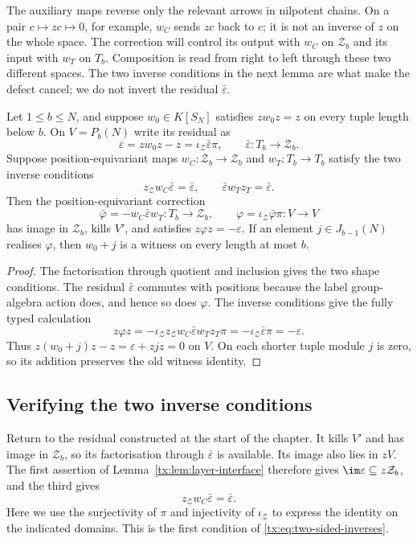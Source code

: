 The auxiliary maps reverse only the relevant arrows in nilpotent
chains. On a pair $c\mapsto zc\mapsto0$, for example, $w_C$ sends
$zc$ back to $c$; it is not an inverse of $z$ on the whole space.
The correction will control its output with $w_C$ on $\mathcal Z_b$
and its input with $w_T$ on $T_b$. Composition is read from right
to left through these two different spaces. The two inverse
conditions in the next lemma are what make the defect cancel;
we do not invert the residual $\bar\varepsilon$.

\begin{lemma}\label{tx:lem:two-sided-correction}
Let $1\le b\le N$, and suppose $w_0\in K[S_N]$ satisfies $zw_0z=z$ on every tuple length below $b$. On $V=P_b(N)$ write its residual as
\[
 \varepsilon=zw_0z-z=\iota_{\mathcal Z}\bar\varepsilon\pi,
 \qquad \bar\varepsilon:T_b\longrightarrow\mathcal Z_b.
\]
Suppose position-equivariant maps $w_C:\mathcal Z_b\to\mathcal Z_b$ and $w_T:T_b\to T_b$ satisfy the two inverse conditions
\begin{equation}\label{tx:eq:two-sided-inverses}
 z_{\mathcal Z}w_C\bar\varepsilon=\bar\varepsilon,
 \qquad \bar\varepsilon w_Tz_T=\bar\varepsilon.
\end{equation}
Then the position-equivariant correction
\[
 \bar\varphi=-w_C\bar\varepsilon w_T:T_b\to\mathcal Z_b,
 \qquad \varphi=\iota_{\mathcal Z}\bar\varphi\pi:V\to V
\]
has image in $\mathcal Z_b$, kills $V'$, and satisfies $z\varphi z=-\varepsilon$. If an element $j\in J_{b-1}(N)$ realises $\varphi$, then $w_0+j$ is a witness on every length at most $b$.
\end{lemma}
\begin{proof}
The factorisation through quotient and inclusion gives the two shape conditions. The residual $\bar\varepsilon$ commutes with positions because the label group-algebra action does, and hence so does $\varphi$. The inverse conditions give the fully typed calculation
\[
 z\varphi z
 =-\iota_{\mathcal Z}z_{\mathcal Z}w_C\bar\varepsilon w_Tz_T\pi
 =-\iota_{\mathcal Z}\bar\varepsilon\pi
 =-\varepsilon.
\]
Thus $z(w_0+j)z-z=\varepsilon+zjz=0$ on $V$. On each shorter tuple module $j$ is zero, so its addition preserves the old witness identity.
\end{proof}

\subsection{Verifying the two inverse conditions}
Return to the residual constructed at the start of the chapter. It kills $V'$ and has image in $\mathcal Z_b$, so its factorisation through $\bar\varepsilon$ is available. Its image also lies in $zV$. The first assertion of Lemma~\ref{tx:lem:layer-interface} therefore gives $\im\varepsilon\subseteq z\mathcal Z_b$, and the third gives
\[
                       z_{\mathcal Z}w_C\bar\varepsilon=\bar\varepsilon.
\]
Here we use the surjectivity of $\pi$ and injectivity of
$\iota_{\mathcal Z}$ to express the identity on the indicated domains.
This is the first condition of \eqref{tx:eq:two-sided-inverses}.

